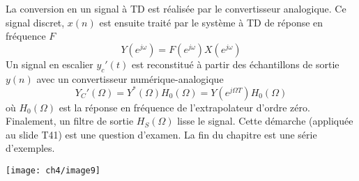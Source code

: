 	La conversion en un signal à TD est réalisée par le convertisseur analogique. Ce signal 
	discret, $x(n)$ est ensuite traité par le système à TD de réponse en fréquence $F$
	\begin{equation}
	Y(e^{j\omega}) = F(e^{j\omega})X(e^{j\omega})
	\end{equation}
	Un signal en escalier $y_c'(t)$ est reconstitué à partir des échantillons de sortie $y(n)$ 
	avec un convertisseur numérique-analogique
	\begin{equation}
	Y_C'(\Omega) = Y^*(\Omega)H_0(\Omega) = Y(e^{j\Omega T})H_0(\Omega)
	\end{equation}
	où $H_0(\Omega)$ est la réponse en fréquence de l'extrapolateur d'ordre zéro. Finalement, 
	un filtre de sortie $H_S(\Omega)$ lisse le signal. Cette démarche (appliquée au slide T41) 
	est une question d'examen.  La fin du chapitre est une série d'exemples.\\

	\begin{center}
		\texttt{[image: ch4/image9]}
\end{center}
	
	
	
	
	
	
	
	
	
	
	
	
	
	
	
	
	
	
	
	
	
	
	
	
	
	
	
	
	